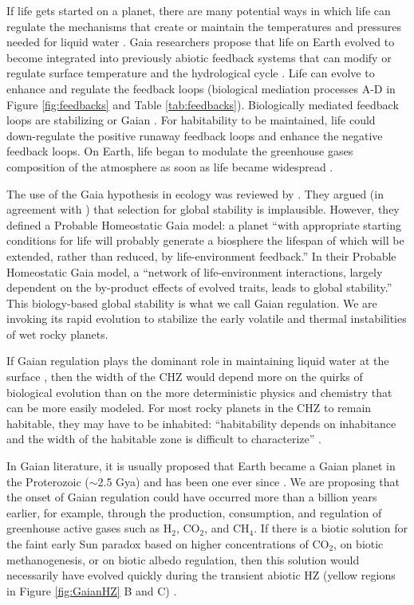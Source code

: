 If life gets started on a planet, there are many potential ways in which life can regulate the mechanisms that create or maintain 
the temperatures and pressures needed for liquid water \citep{Schneider1991,Schneider2004,Harding2010}. Gaia researchers propose that life on Earth evolved to become integrated into previously abiotic feedback systems that can modify or regulate surface temperature and the hydrological cycle \citep[\eg,][]{Lenton1998,Nisbet2012}. Life can evolve to enhance and regulate the feedback loops  (biological mediation processes A-D in Figure \ref{fig:feedbacks} and Table \ref{tab:feedbacks}).
Biologically mediated feedback loops are stabilizing or Gaian \citep{Ricklefs2000}. For habitability to be maintained, life could down-regulate the positive runaway feedback loops and enhance the negative feedback loops. On Earth, life began to modulate the greenhouse gases composition of the atmosphere as soon as life became widespread \citep{Nisbet2002,Nisbet2012,Nisbet2014,Johnson2015}.

The use of the Gaia hypothesis in ecology was reviewed by \citet{Free2007}. They argued (in agreement with \citet{Dawkins1982}) that selection for global stability is implausible.
However, they defined a Probable Homeostatic Gaia model: a planet ``with appropriate starting conditions for life will probably generate a biosphere the lifespan of which will be extended, rather than reduced, by life-environment feedback.'' In their Probable Homeostatic Gaia model, a ``network of life-environment interactions, largely dependent on the by-product effects of evolved traits, leads to global stability.''
This biology-based global stability is what we call Gaian regulation.  We are invoking its rapid evolution to stabilize the early volatile and thermal
instabilities of wet rocky planets.

If Gaian regulation plays the dominant role in maintaining liquid water at the surface \citep{Harding2010}, then the width of the CHZ would depend more on 
the quirks of biological evolution than on the more deterministic physics and chemistry that can be more easily modeled. For most rocky planets in the CHZ to remain habitable, they may have to be inhabited:
``habitability depends on inhabitance and the width of the habitable zone is difficult to characterize'' \citep{Goldblatt2015}.


In Gaian literature, it is usually proposed that  Earth became a Gaian planet in the Proterozoic ($\sim$2.5 Gya) and has been one ever since \citep[p.45]{Harding2010}. We are proposing that the onset of Gaian regulation could have occurred more than a billion years earlier, for example, through the production, consumption, and regulation of greenhouse active gases such as H$_{2}$, CO$_{2}$, and CH$_{4}$. If there is a biotic solution for the faint early Sun paradox \citep{Sagan1972,Sagan1997,Feulner2012} based on higher concentrations of CO$_2$, on biotic methanogenesis, or on biotic albedo regulation, then this solution would necessarily have evolved quickly during the transient abiotic HZ (yellow regions in Figure \ref{fig:GaianHZ} B and C) \citep{Walker1985,Pavlov2003,Haqq-Misra2008,Rosing2010}.

